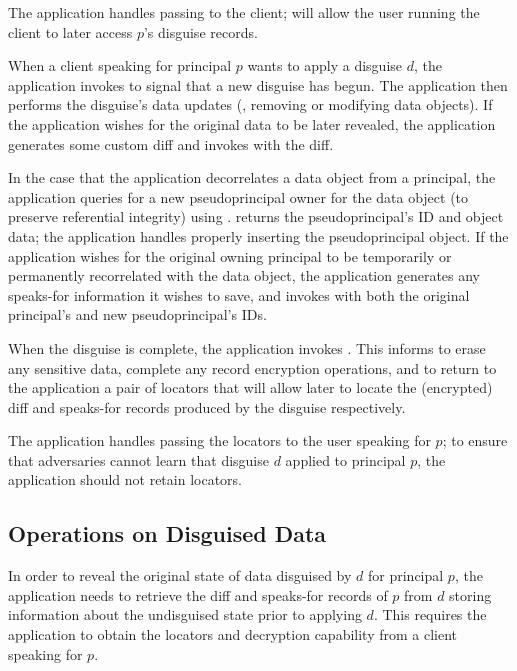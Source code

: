 The application handles passing  to the client;  will allow the user running the
client to later access $p$'s disguise records.

When a client speaking for principal $p$ wants to apply a disguise $d$,
the application invokes  to signal \sys that a new disguise has begun.
The application then performs the disguise's data updates (\eg, removing or modifying
data objects). If the application wishes for the original data to be later revealed, the
application generates some custom diff and invokes  with the diff.

In the case that the application decorrelates a data object from a principal, the application
queries \sys for a new pseudoprincipal owner for the data object (to preserve referential integrity)
using . \sys returns the pseudoprincipal's ID and object data; the
application handles properly inserting the pseudoprincipal object.  If the application wishes for
the original owning principal to be temporarily or permanently recorrelated with the data object,
the application generates any speaks-for information it wishes to save, and invokes
 with both the original principal's and new pseudoprincipal's IDs.

When the disguise is complete, the application invokes . This informs \sys to erase
any sensitive data, complete any record encryption operations, and to return to the application a
pair of locators that will allow \sys later to locate the (encrypted) diff and speaks-for records
produced by the disguise respectively.

The application handles passing the locators  to the user speaking for $p$; to ensure that
adversaries cannot learn that disguise $d$ applied to principal $p$, the application should not
retain locators.

\subsection{Operations on Disguised Data}

In order to reveal the original state of data disguised by $d$ for principal $p$, the application
needs to retrieve the diff and speaks-for records of $p$ from $d$ storing information about the undisguised
state prior to applying $d$.
This requires the application to obtain the locators  and decryption capability 
from a client speaking for $p$.

